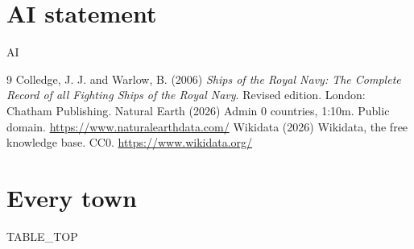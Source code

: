 \documentclass[11pt,a4paper]{article}
\begin{document}
\section*{AI statement}
{{AI}}

\begin{thebibliography}{9}
 Colledge, J. J. and Warlow, B. (2006) \textit{Ships of the Royal Navy: The Complete Record of all Fighting Ships of the Royal Navy}. Revised edition. London: Chatham Publishing.
 Natural Earth (2026) Admin 0 countries, 1:10m. Public domain. \url{https://www.naturalearthdata.com/}
 Wikidata (2026) Wikidata, the free knowledge base. CC0. \url{https://www.wikidata.org/}
\end{thebibliography}

\appendix
\section{Every town}
{{TABLE_TOP}}
\end{document}
